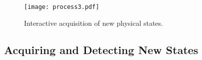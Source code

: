 \documentclass[letterpaper]{article} %
\begin{document}

\begin{figure}
\texttt{[image: process3.pdf]}
\centering
\vspace{-10pt}
\caption{Interactive acquisition of new physical states.}
\label{fig:process}
\vspace{-5pt}
\end{figure}

\subsection{Acquiring and Detecting New States}



\end{document}
